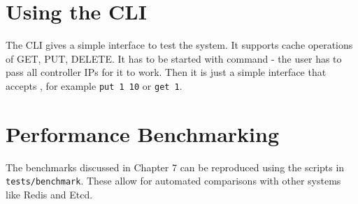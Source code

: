 \documentclass[shortabstract]{iithesis}
\begin{document}
\section{Using the CLI}

The CLI gives a simple interface to test the system. It supports cache operations of GET, PUT, DELETE. It has to be started with command  - the user has to pass all controller IPs for it to work. Then it is just a simple interface that accepts , for example \texttt{put 1 10} or \texttt{get 1}. 

\section{Performance Benchmarking}
The benchmarks discussed in Chapter 7 can be reproduced using the scripts in \texttt{tests/benchmark}. These allow for automated comparisons with other systems like Redis and Etcd.
\end{document}
